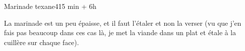 {\begin{recette}{Marinade texane}{4}{15 min + 6h}{}
\begin{remarque}
La marinade est un peu épaisse, et il faut l'étaler et non la verser (vu que j'en fais pas beaucoup dans ces cas là, je met la 
viande dans un plat et étale à la cuillère sur chaque face).
\end{remarque}
\end{recette}


}%
